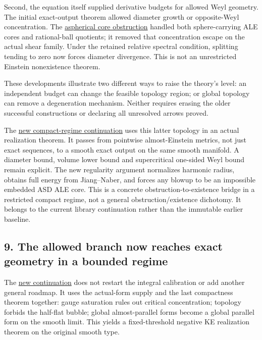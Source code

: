 \documentclass[
  10pt,
]{article}
\begin{document}
Second, the equation itself supplied derivative budgets for allowed Weyl
geometry. The initial exact-output theorem allowed diameter growth or
opposite-Weyl concentration. The
\href{../mathematics/current/line1_aspherical_no_bubbles.md}{aspherical
core obstruction} handled both sphere-carrying ALE cores and
rational-ball quotients; it removed that concentration escape on the
actual shear family. Under the retained relative spectral condition,
splitting tending to zero now forces diameter divergence. This is not an
unrestricted Einstein nonexistence theorem.

These developments illustrate two different ways to raise the theory's
level: an independent budget can change the feasible topology region; or
global topology can remove a degeneration mechanism. Neither requires
erasing the older successful constructions or declaring all unresolved
arrows proved.

The \href{../continuation/20260923_compact_realization.md}{new
compact-regime continuation} uses this latter topology in an actual
realization theorem. It passes from pointwise almost-Einstein metrics,
not just exact sequences, to a smooth exact output on the same smooth
manifold. A diameter bound, volume lower bound and supercritical
one-sided Weyl bound remain explicit. The new regularity argument
normalizes harmonic radius, obtains full energy from Jiang--Naber, and
forces any blowup to be an impossible embedded ASD ALE core. This is a
concrete obstruction-to-existence bridge in a restricted compact regime,
not a general obstruction/existence dichotomy. It belongs to the current
library continuation rather than the immutable earlier baseline.

\hypertarget{the-allowed-branch-now-reaches-exact-geometry-in-a-bounded-regime}{%
\subsection{9. The allowed branch now reaches exact geometry in a
bounded
regime}\label{the-allowed-branch-now-reaches-exact-geometry-in-a-bounded-regime}}

The \href{../continuation/20260923_realization_and_rigidity.md}{new
continuation} does not restart the integral calibration or add another
general roadmap. It uses the actual-form supply and the last compactness
theorem together: gauge saturation rules out critical concentration;
topology forbids the half-flat bubble; global almost-parallel forms
become a global parallel form on the smooth limit. This yields a
fixed-threshold negative KE realization theorem on the original smooth
type.
\end{document}

